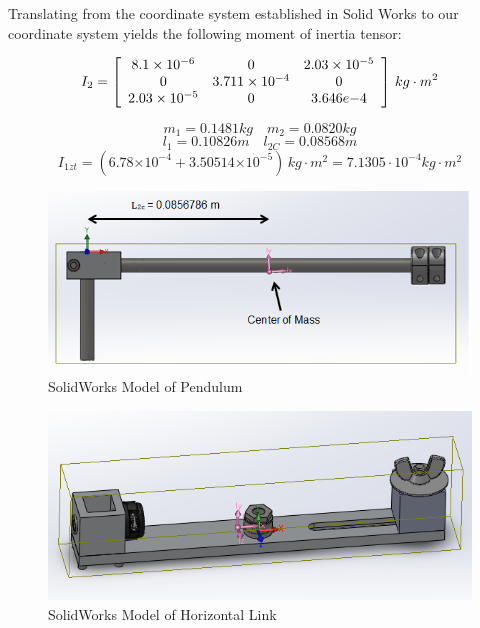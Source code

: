 \documentclass{article}
\theoremstyle{plain}
\theoremstyle{definition}
\theoremstyle{remark}
\providecommand{\e}[1]{\ensuremath{\times 10^{#1}}}
\begin{document}
Translating from the coordinate system established in Solid Works to our coordinate system yields the following moment of inertia tensor:

$$I_{2} = \left[ \begin{array}{c c c l} 
8.1\e{-6} & 0 & 2.03\e{-5} \\   
0 & 3.711\e{-4} & 0 \\
2.03\e{-5} & 0 & 3.646e{-4} \\
\end{array} \right] \, kg \cdot m^2$$

\begin{center}
$$m_{1} = 0.1481 kg \quad m_{2} = 0.0820 kg $$
$$ l_{1} = 0.10826 m \quad l_{2C} = 0.08568 m $$
$$I_{1zt} = \left(6.78 \e{-4} + 3.50514 \e{-5} \right) \, kg \cdot m^2 =  7.1305\cdot 10^{-4}kg\cdot m^{2}$$
\end{center}

\begin{figure}[htb]
\begin{center}
\includegraphics[width = 14cm]{PendulumModel.png}
\caption{SolidWorks Model of Pendulum}
\label{q2_3}
\end{center}
\end{figure}

\begin{figure}[htb]
\begin{center}
\includegraphics[width = 14cm]{Horizontal.png}
\caption{SolidWorks Model of Horizontal Link}
\label{q2_4}
\end{center}
\end{figure}
\end{document}
